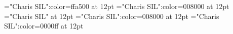 \documentclass[a4paper]{article}
\begin{document}
\pagestyle{plain}
\sloppy
\setlength{\parfillskip}{0pt plus 1fil}
\font\xitemen="Charis SIL":color=ffa500 at 12pt
\font\xitemenxitem="Charis SIL":color=008000 at 12pt
\font\main="Charis SIL" at 12pt
\font\xitemenmain="Charis SIL":color=008000 at 12pt
\font\xitemxitemmain="Charis SIL":color=0000ff at 12pt

\pagestyle{fancy} 








\end{document}
